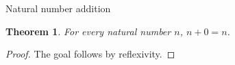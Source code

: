 \documentclass[11pt]{article}
\newtheorem{theorem}{Theorem}[section]
\theoremstyle{definition}
\begin{document}
\begin{center}
{\LARGE Natural number addition}
\end{center}
\begin{theorem}
\label{ll:main:add-zero}
For every natural number \(n\), \(n + 0 = n\).
\end{theorem}
\begin{proof}
The goal follows by reflexivity.
\end{proof}
\end{document}

